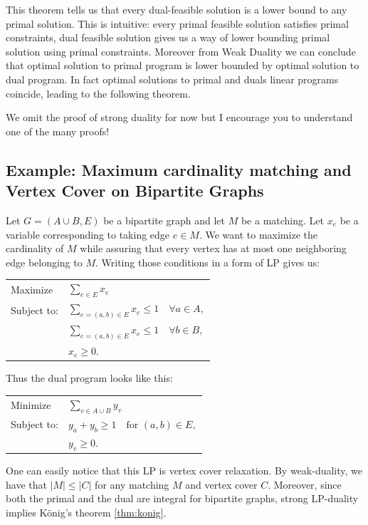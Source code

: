 
This theorem tells us that every dual-feasible solution is a lower bound to any primal solution.
This is intuitive: every primal feasible solution satisfies primal constraints, dual feasible
solution gives us a way of lower bounding primal solution using primal constraints. Moreover from
Weak Duality we can conclude that optimal solution to primal program is lower bounded by optimal
solution to dual program. In fact optimal solutions to primal and duals linear programs coincide,
leading to the following theorem.
\label{thm:strong}

We omit the proof of strong duality for now but I encourage you to understand one of the many
proofs!

\subsection{Example: Maximum cardinality matching and Vertex Cover on Bipartite Graphs}

Let $G=(A\cup B,E)$ be a bipartite graph and let $M$ be a matching. Let $x_e$ be a variable
corresponding to taking edge $e\in M$. We want to maximize the cardinality of $M$ while assuring
that every vertex has at most one neighboring edge belonging to $M$. Writing those conditions in a
form of LP gives us:
\begin{center}
\begin{tabular}{ll}
  Maximize    & $\displaystyle\sum_{e\in E}x_e$\\[8pt]
  Subject to: & $\displaystyle\sum_{e=(a,b)\in E}x_e\le 1\quad\forall a\in A,$\\[8pt]
              & $\displaystyle\sum_{e=(a,b)\in E}x_e\le 1\quad\forall b\in B,$\\[8pt]
              & $x_e\ge 0.$
\end{tabular}
\end{center}
Thus the dual program looks like this:
\begin{center}
\begin{tabular}{ll}
  Minimize    & $\displaystyle\sum_{v\in A\cup B}y_v$\\[8pt]
  Subject to: & $y_a+y_b\ge 1\quad\text{for }(a,b)\in E,$\\[4pt]
              & $y_v\ge 0.$
\end{tabular}
\end{center}
One can easily notice that this LP is vertex cover relaxation. By weak-duality, we have that
$|M|\le|C|$ for any matching $M$ and vertex cover $C$. Moreover, since both the primal and the
dual are integral for bipartite graphs, strong LP-duality implies K\"onig's theorem \ref{thm:konig}.\\


